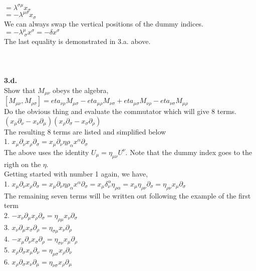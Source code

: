 \documentclass[prb,preprint]
{revtex4-1}
\newcommand{\PRLsep}{\noindent\makebox[\linewidth]{\resizebox{0.8888\linewidth}{2pt}{$\bullet$}}\bigskip}
\begin{document}
$=\lambda^{\sigma\mu} x_\sigma$
\\
$=-\lambda^{\mu\sigma} x_\sigma$
\\
We can always swap the vertical positions of the dummy indices.
\\
$=-\lambda^\mu_{\;\sigma} x^\sigma = -\delta x^\sigma$
\\
The last equality is demonstrated in 3.a. above.
\\
\\
\PRLsep
\\
\\
\newpage
\textbf{3.d.}
\\
Show that $M_{\mu\nu}$ obeys the algebra, 
$\left[M_{\mu\nu}, M_{\rho\sigma}\right] = eta_{\nu\rho}M_{\mu\sigma} - eta_{\mu\rho}M_{\nu\sigma} + eta_{\mu\sigma}M_{\nu\rho} - eta_{\nu\sigma}M_{\mu\rho}$
\\
Do the obvious thing and evaluate the commutator which will give 8 terms.
\\
$\left(x_\mu \partial_\nu - x_\nu \partial_\mu\right)\left(x_\rho \partial_\sigma - x_\sigma \partial_\rho\right)$
\\
The resulting 8 terms are listed and simplified below
\\
1.  $x_\mu \partial_\nu x_\rho \partial_\sigma = x_\mu\partial_\nu\eta{\rho_\alpha}x^\alpha \partial_\sigma$
\\
The above uses the identity $U_\mu = \eta_{\mu\nu}U^\nu$.  Note that the dummy index goes to the rigth on the $\eta$.
\\
Getting started with number 1 again, we have,
\\
1.  $x_\mu \partial_\nu x_\rho \partial_\sigma = x_\mu\partial_\nu\eta{\rho_\alpha}x^\alpha \partial_\sigma = x_\mu \delta_\nu^\alpha \eta_{\rho\alpha} = x_\mu \eta_{\rho\nu} \partial_\sigma = \eta_{\rho\nu} x_\mu \partial_\sigma$
\\
The remaining seven terms will be written out following the example of the first term
\\
2.  $-x_\nu \partial_\mu x_\rho \partial_\sigma = \eta_{\rho\mu} x_\nu \partial_\sigma$
\\
3.  $x_\nu \partial_\mu x_\sigma \partial_\rho = \eta_{\sigma\mu} x_\nu \partial_\rho$
\\
4.  $-x_\mu \partial_\nu x_\sigma \partial_\rho = \eta_{\sigma\nu} x_\mu \partial_\rho$
\\
5.  $x_\rho \partial_\sigma x_\mu \partial_\nu = \eta_{\mu\sigma} x_\rho \partial_\nu$
\\
6.  $x_\rho \partial_\sigma x_\nu \partial_\mu = \eta_{\nu\sigma} x_\rho \partial_\mu$
\end{document}
